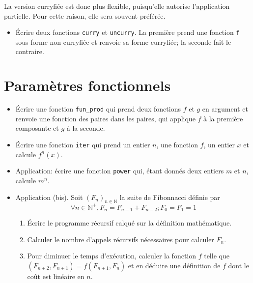 \documentclass[11pt, a4paper]{article}
\begin{document}
La version curryfiée est donc plus flexible, puisqu'elle autorise
l'application partielle. Pour cette raison, elle sera souvent
préférée.

\begin{itemize}
\item \'{E}crire deux fonctions {\tt curry} et {\tt uncurry}. La
      première prend une fonction {\tt f} sous forme non curryfiée et
      renvoie sa forme curryfiée; la seconde fait le contraire.
\end{itemize}


\section{Paramètres fonctionnels}

\begin{itemize}

  \item Écrire une fonction \verb+fun_prod+ qui prend deux
  fonctions $f$ et $g$ en argument et renvoie une fonction des paires
  dans les paires, qui applique $f$ à la première composante et $g$ à
  la seconde.

  \item Écrire une fonction \verb+iter+ qui prend un entier $n$,
  une fonction $f$, un entier $x$ et calcule $f^n(x)$.

  \item Application: écrire une fonction \verb|power| qui, étant
  donnés deux entiers $m$ et $n$, calcule $m^n$.

  \item Application (bis). Soit $(F_n)_{n \in \mathbb{N}}$ la suite de
  Fibonnacci définie par $$\forall n \in \mathbb{N}^{+}, F_n = F_{n-1}
  + F_{n-2}; F_0 = F_1 = 1$$

  \begin{enumerate}

    \item Écrire le programme récursif calqué sur la définition
    mathématique.

    \item Calculer le nombre d'appels récursifs nécessaires pour
    calculer $F_n$.

    \item Pour diminuer le temps d'exécution, calculer la fonction
    $f$ telle que $(F_{n+2},F_{n+1}) = f (F_{n+1},F_{n})$ et en
    déduire une définition de $f$ dont le coût est linéaire en $n$.

  \end{enumerate}


\end{itemize}
\end{document}
